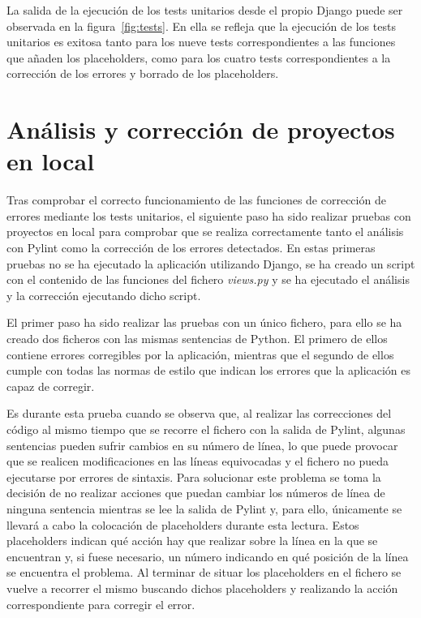 \documentclass[a4paper, 12pt]{book}
\begin{document}
La salida de la ejecución de los tests unitarios desde el propio Django puede ser observada en la figura~\ref{fig:tests}. En ella se refleja que la ejecución de los tests unitarios es exitosa tanto para los nueve tests correspondientes a las funciones que añaden los placeholders, como para los cuatro tests correspondientes a la corrección de los errores y borrado de los placeholders.

\section{Análisis y corrección de proyectos en local}
\label{sec:tests_local}

Tras comprobar el correcto funcionamiento de las funciones de corrección de errores mediante los tests unitarios, el siguiente paso ha sido realizar pruebas con proyectos en local para comprobar que se realiza correctamente tanto el análisis con Pylint como la corrección de los errores detectados.
En estas primeras pruebas no se ha ejecutado la aplicación utilizando Django, se ha creado un script con el contenido de las funciones del fichero \textit{views.py} y se ha ejecutado el análisis y la corrección ejecutando dicho script.

El primer paso ha sido realizar las pruebas con un único fichero, para ello se ha creado dos ficheros con las mismas sentencias de Python.
El primero de ellos contiene errores corregibles por la aplicación, mientras que el segundo de ellos cumple con todas las normas de estilo que indican los errores que la aplicación es capaz de corregir.

Es durante esta prueba cuando se observa que, al realizar las correcciones del código al mismo tiempo que se recorre el fichero con la salida de Pylint, algunas sentencias pueden sufrir cambios en su número de línea, lo que puede provocar que se realicen modificaciones en las líneas equivocadas y el fichero no pueda ejecutarse por errores de sintaxis.
Para solucionar este problema se toma la decisión de no realizar acciones que puedan cambiar los números de línea de ninguna sentencia mientras se lee la salida de Pylint y, para ello, únicamente se llevará a cabo la colocación de placeholders durante esta lectura.
Estos placeholders indican qué acción hay que realizar sobre la línea en la que se encuentran y, si fuese necesario, un número indicando en qué posición de la línea se encuentra el problema.
Al terminar de situar los placeholders en el fichero se vuelve a recorrer el mismo buscando dichos placeholders y realizando la acción correspondiente para corregir el error.
\end{document}
